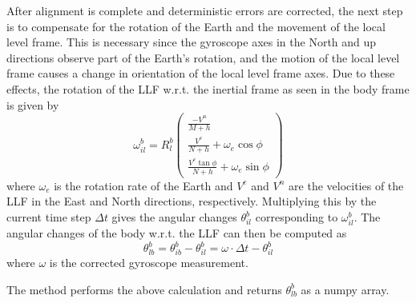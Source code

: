 \documentclass[11pt, oneside]{article}   	%
\begin{document}
After alignment is complete and deterministic errors are corrected, the next step is to compensate for the rotation of the Earth and the movement of the local level frame.  This is necessary since the gyroscope axes in the North and up directions observe part of the Earth's rotation, and the motion of the local level frame causes a change in orientation of the local level frame axes.  Due to these effects, the rotation of the LLF w.r.t. the inertial frame as seen in the body frame is given by 
\begin{equation}
\omega_{il}^b=R_l^b\begin{pmatrix}
\frac{-V^n}{M+h} \\[.1cm]
\frac{V^e}{N+h}+\omega_e \cos\phi \\[.1cm]
\frac{V^e\tan\phi}{N+h}+\omega_e \sin\phi
\end{pmatrix}
\end{equation}
where $\omega_e$ is the rotation rate of the Earth and $V^e$ and $V^n$ are the velocities of the LLF in the East and North directions, respectively.  Multiplying this by the current time step $\Delta t$ gives the angular changes $\theta_{il}^b$ corresponding to $\omega_{il}^b$.  The angular changes of the body w.r.t. the LLF can then be computed as 
\begin{equation}
\theta_{lb}^b=\theta_{ib}^b-\theta_{il}^b=\omega\cdot\Delta t-\theta_{il}^b
\end{equation}
where $\omega$ is the corrected gyroscope measurement.

The  method performs the above calculation and returns $\theta_{lb}^b$ as a numpy array.
\end{document}
